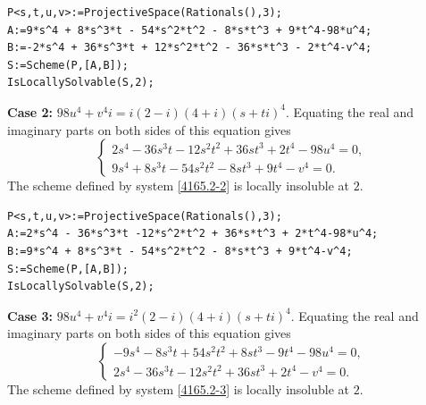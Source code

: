 \documentclass[a4paper,12pt,english,reqno]{amsart}
\begin{document}
\begin{lstlisting}
P<s,t,u,v>:=ProjectiveSpace(Rationals(),3);
A:=9*s^4 + 8*s^3*t - 54*s^2*t^2 - 8*s*t^3 + 9*t^4-98*u^4;
B:=-2*s^4 + 36*s^3*t + 12*s^2*t^2 - 36*s*t^3 - 2*t^4-v^4;
S:=Scheme(P,[A,B]);
IsLocallySolvable(S,2);
\end{lstlisting}


{\bf Case 2:} $98u^4+v^4i=i(2-i)(4+i)(s+ti)^4$. Equating the real and imaginary parts on both sides of this equation gives
\begin{equation}\label{4165.2-2}
\begin{cases}
2s^4 - 36s^3t - 12s^2t^2 + 36st^3 + 2t^4 - 98u^4=0,\\
9s^4 + 8s^3t - 54s^2t^2 - 8st^3 + 9t^4 - v^4=0.
\end{cases}
\end{equation}
The scheme defined by system \eqref{4165.2-2} is locally insoluble at $2$.


\begin{lstlisting}
P<s,t,u,v>:=ProjectiveSpace(Rationals(),3);
A:=2*s^4 - 36*s^3*t -12*s^2*t^2 + 36*s*t^3 + 2*t^4-98*u^4;
B:=9*s^4 + 8*s^3*t - 54*s^2*t^2 - 8*s*t^3 + 9*t^4-v^4;
S:=Scheme(P,[A,B]);
IsLocallySolvable(S,2);
\end{lstlisting}

{\bf Case 3:} $98u^4+v^4i=i^2(2-i)(4+i)(s+ti)^4$. Equating the real and imaginary parts on both sides of this equation gives
\begin{equation}\label{4165.2-3}
\begin{cases}
-9s^4 - 8s^3t + 54s^2t^2 + 8st^3 - 9t^4 - 98u^4=0,\\
2s^4 - 36s^3t - 12s^2t^2 + 36st^3 + 2t^4 - v^4=0.
\end{cases}
\end{equation}
The scheme defined by system \eqref{4165.2-3} is locally insoluble at $2$.
\end{document}
